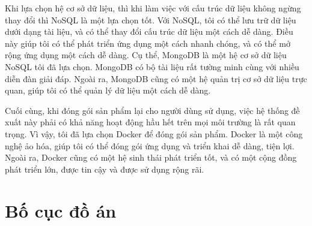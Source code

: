 \documentclass[../DoAn.tex]{subfiles}
\begin{document}
Khi lựa chọn hệ cơ sở dữ liệu, thì khi làm việc với cấu trúc dữ liệu không ngừng thay đổi thì NoSQL là một lựa chọn tốt. Với NoSQL, tôi có thể lưu trữ dữ liệu dưới dạng tài liệu, và có thể thay đổi cấu trúc dữ liệu một cách dễ dàng. Điều này giúp tôi có thể phát triển ứng dụng một cách nhanh chóng, và có thể mở rộng ứng dụng một cách dễ dàng. Cụ thể, MongoDB là một hệ cơ sở dữ liệu NoSQL tôi đã lựa chọn. MongoDB có bộ tài liệu rất tường minh cùng với nhiều diễn đàn giải đáp. Ngoài ra, MongoDB cũng có một hệ quản trị cơ sở dữ liệu trực quan, giúp tôi có thể quản lý dữ liệu một cách dễ dàng.

Cuối cùng, khi đóng gói sản phẩm lại cho người dùng sử dụng, việc hệ thống đề xuất này phải có khả năng hoạt động hầu hết trên mọi môi trường là rất quan trọng. Vì vậy, tôi đã lựa chọn Docker để đóng gói sản phẩm. Docker là một công nghệ ảo hóa, giúp tôi có thể đóng gói ứng dụng và triển khai dễ dàng, tiện lợi. Ngoài ra, Docker cũng có một hệ sinh thái phát triển tốt, và có một cộng đồng phát triển lớn, được tin cậy và được sử dụng rộng rãi.
\vfill
\break


\section{Bố cục đồ án}
\label{section:1.4}






\end{document}
